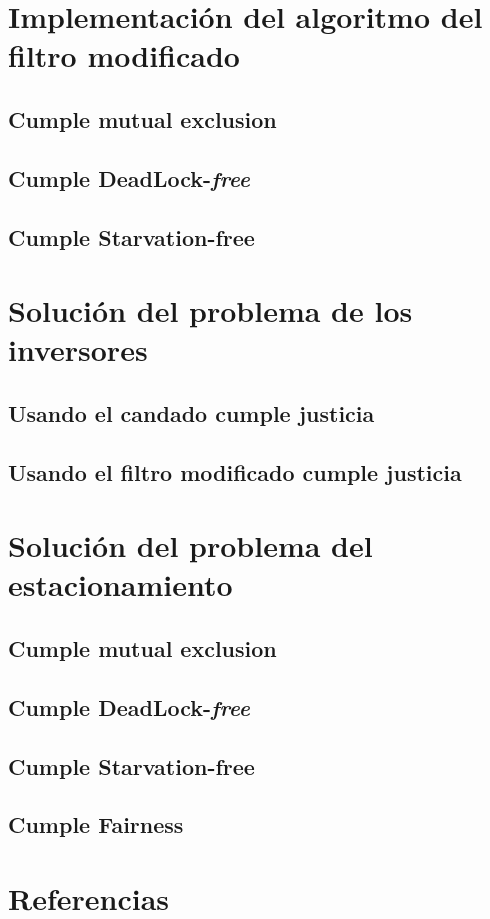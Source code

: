 \documentclass[letterpaper]{article}
\begin{document}
	
	
	
	
	\section{Implementación del algoritmo del filtro modificado}
		\subsection{Cumple mutual exclusion}
		\subsection{Cumple DeadLock-\textit{free}}
		\subsection{Cumple Starvation-free}
	\section{Solución del problema de los inversores}
		\subsection{Usando el candado cumple justicia}
		\subsection{Usando el filtro modificado cumple justicia}
	\section{Solución del problema del estacionamiento}
		\subsection{Cumple mutual exclusion}
		\subsection{Cumple DeadLock-\textit{free}}
		\subsection{Cumple Starvation-free}
		\subsection{Cumple Fairness}
	\section[APA]{Referencias}

	
	
\end{document}
